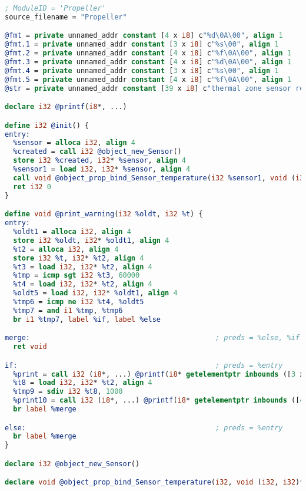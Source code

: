 \begin{lstlisting}[language=llvm,backgroundcolor=\color{backgroundcolor}]
; ModuleID = 'Propeller'
source_filename = "Propeller"

@fmt = private unnamed_addr constant [4 x i8] c"%d\0A\00", align 1
@fmt.1 = private unnamed_addr constant [3 x i8] c"%s\00", align 1
@fmt.2 = private unnamed_addr constant [4 x i8] c"%f\0A\00", align 1
@fmt.3 = private unnamed_addr constant [4 x i8] c"%d\0A\00", align 1
@fmt.4 = private unnamed_addr constant [3 x i8] c"%s\00", align 1
@fmt.5 = private unnamed_addr constant [4 x i8] c"%f\0A\00", align 1
@str = private unnamed_addr constant [39 x i8] c"thermal zone sensor readout too high: \00", align 1

declare i32 @printf(i8*, ...)

define i32 @init() {
entry:
  %sensor = alloca i32, align 4
  %created = call i32 @object_new_Sensor()
  store i32 %created, i32* %sensor, align 4
  %sensor1 = load i32, i32* %sensor, align 4
  call void @object_prop_bind_Sensor_temperature(i32 %sensor1, void (i32, i32)* @print_warning)
  ret i32 0
}

define void @print_warning(i32 %oldt, i32 %t) {
entry:
  %oldt1 = alloca i32, align 4
  store i32 %oldt, i32* %oldt1, align 4
  %t2 = alloca i32, align 4
  store i32 %t, i32* %t2, align 4
  %t3 = load i32, i32* %t2, align 4
  %tmp = icmp sgt i32 %t3, 60000
  %t4 = load i32, i32* %t2, align 4
  %oldt5 = load i32, i32* %oldt1, align 4
  %tmp6 = icmp ne i32 %t4, %oldt5
  %tmp7 = and i1 %tmp, %tmp6
  br i1 %tmp7, label %if, label %else

merge:                                            ; preds = %else, %if
  ret void

if:                                               ; preds = %entry
  %print = call i32 (i8*, ...) @printf(i8* getelementptr inbounds ([3 x i8], [3 x i8]* @fmt.4, i32 0, i32 0), i8* getelementptr inbounds ([39 x i8], [39 x i8]* @str, i32 0, i32 0))
  %t8 = load i32, i32* %t2, align 4
  %tmp9 = sdiv i32 %t8, 1000
  %print10 = call i32 (i8*, ...) @printf(i8* getelementptr inbounds ([4 x i8], [4 x i8]* @fmt.3, i32 0, i32 0), i32 %tmp9)
  br label %merge

else:                                             ; preds = %entry
  br label %merge
}

declare i32 @object_new_Sensor()

declare void @object_prop_bind_Sensor_temperature(i32, void (i32, i32)*)
\end{lstlisting}

